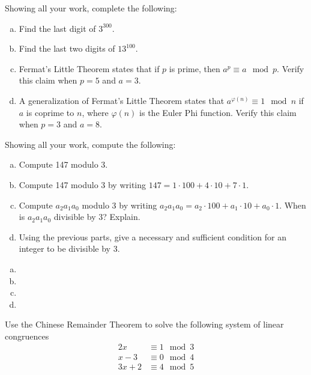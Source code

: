 \documentclass[11pt,letterpaper]{article}
\begin{document}

 Showing all your work, complete the following:
	\begin{enumerate}[(a)]
	\item Find the last digit of $3^{300}$.
	\item Find the last two digits of $13^{100}$.
	\item Fermat's Little Theorem states that if $p$ is prime, then $a^p \equiv a \mod p$. Verify this claim when $p= 5$ and $a= 3$. 
	\item A generalization of Fermat's Little Theorem states that $a^{\varphi(n)} \equiv 1 \mod n$ if $a$ is coprime to $n$, where $\varphi(n)$ is the Euler Phi function. Verify this claim when $p= 3$ and $a= 8$. 
	\end{enumerate}



\newpage



 Showing all your work, compute the following:
	\begin{enumerate}[(a)]
	\item Compute 147 modulo 3. 
	\item Compute 147 modulo 3 by writing $147= 1 \cdot 100 + 4 \cdot 10 + 7 \cdot 1$.
	\item Compute $a_2a_1a_0$ modulo 3 by writing $a_2a_1a_0= a_2 \cdot 100 + a_1 \cdot 10 + a_0 \cdot 1$. When is $a_2a_1a_0$ divisible by 3? Explain.
	\item Using the previous parts, give a necessary and sufficient condition for an integer to be divisible by 3. 
	\end{enumerate} \pspace

\sol 
\begin{enumerate}[(a)]
\item 
\item 
\item 
\item 
\end{enumerate}



\newpage



 Use the Chinese Remainder Theorem to solve the following system of linear congruences
	\[
	\begin{aligned}
	2x &\equiv 1 \mod 3 \\
	x - 3&\equiv 0 \mod 4 \\
	3x + 2&\equiv 4 \mod 5
	\end{aligned}
	\]
\end{document}
